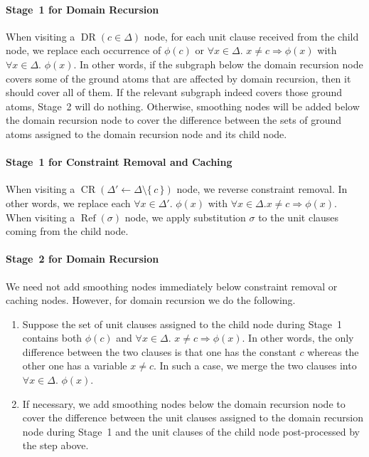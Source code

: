 \documentclass{article}
\theoremstyle{remark}
\DeclareMathOperator{\CR}{CR}
\DeclareMathOperator{\DR}{DR}
\DeclareMathOperator{\Reff}{Ref}
\begin{document}
\paragraph{Stage~1 for Domain Recursion}
When visiting a $\DR(c \in \Delta)$ node, for each unit clause received from the
child node, we replace each occurrence of $\phi(c)$ or
$\forall x \in \Delta\text{. } x \ne c \Rightarrow \phi(x)$ with
$\forall x \in \Delta\text{. }\phi(x)$. In other words, if the subgraph below
the domain recursion node covers some of the ground atoms that are affected by
domain recursion, then it should cover all of them. If the relevant subgraph
indeed covers those ground atoms, Stage~2 will do nothing. Otherwise, smoothing
nodes will be added below the domain recursion node to cover the difference
between the sets of ground atoms assigned to the domain recursion node and its
child node.

\paragraph{Stage~1 for Constraint Removal and Caching}
When visiting a $\CR(\Delta' \gets \Delta \setminus \{\,c\,\})$ node, we reverse
constraint removal. In other words, we replace each
$\forall x \in \Delta'\text{. }\phi(x)$ with $\forall x \in \Delta\text{.
}x \ne c \Rightarrow \phi(x)$. When visiting a $\Reff(\sigma)$ node, we apply
substitution $\sigma$ to the unit clauses coming from the child node.

\paragraph{Stage~2 for Domain Recursion}
We need not add smoothing nodes immediately below constraint removal or caching
nodes. However, for domain recursion we do the following.
\begin{enumerate}
  \item Suppose the set of unit clauses assigned to the child node during
        Stage~1 contains both $\phi(c)$ and $\forall x \in \Delta\text{.
        } x \ne c \Rightarrow \phi(x)$. In other words, the only difference
        between the two clauses is that one has the constant $c$ whereas the
        other one has a variable $x \ne c$. In such a case, we merge the two
        clauses into $\forall x \in \Delta\text{. }\phi(x)$.
  \item If necessary, we add smoothing nodes below the domain recursion node to
        cover the difference between the unit clauses assigned to the domain
        recursion node during Stage~1 and the unit clauses of the child node
        post-processed by the step above.
\end{enumerate}
\end{document}
